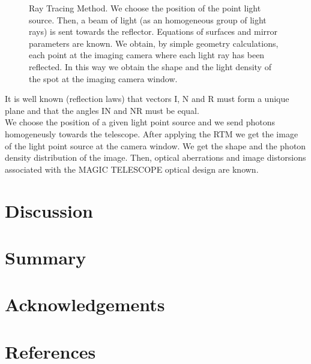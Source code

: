 {%
   \begin{figure}[h]\centering
   \leavevmode
   \epsfxsize=9cm
   \caption{\tiny{Ray Tracing Method. We choose the position of the point light source. Then, a beam of light (as an homogeneous group of light rays)
is sent towards the reflector. Equations of surfaces and mirror parameters are known. We obtain, by simple geometry calculations, each point at the imaging camera where each light ray has been reflected. In this way we obtain the shape and the light density of the spot at the imaging camera window.}}
   \end{figure}
It is well known (reflection laws) that vectors I, N and R must form a unique plane and that the angles IN and NR must be equal.\\

We choose the position of a given light point source and we send photons homogeneusly towards the telescope. After applying the RTM we get the image of the light point source at the camera window. We get the shape and the photon density distribution of the image. Then, optical aberrations and image distorsions associated with the MAGIC TELESCOPE optical design are known.




}

\section{Discussion}

{\footnotesize 




}
\section{Summary}

{\footnotesize 




}

\section*{Acknowledgements}

{\footnotesize 




}

\section*{References}

{\footnotesize 




}






